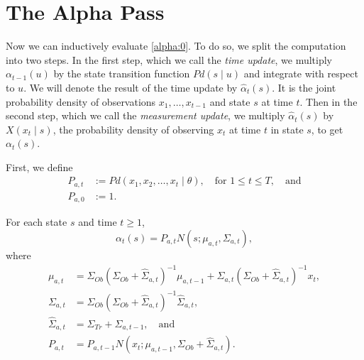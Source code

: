 \documentclass[12pt,leqno]{article}
\begin{document}
\section{The Alpha Pass}
  Now we can inductively evaluate \eqref{alpha:0}. To do so, we split the computation
  into two steps.  In the first step, which we call the {\em time update}, we multiply
  $\alpha_{t-1}(u)$ by the state transition function $Pd(s\mid u)$ and integrate with respect
  to $u$. We will denote the result of the time update by $\hat{\alpha}_t(s)$.  It is the joint probability
  density of observations $x_1,\dots,x_{t-1}$ and state $s$ at time $t$.
  Then in the second step, which we call the {\em measurement update}, we multiply
  $\hat{\alpha}_t(s)$ by $X(x_t \mid s)$, the probability density of observing $x_t$ at time $t$
  in state $s$, to get $\alpha_t(s)$.

  First, we define
\begin{align*}
  P_{a,t} &:= Pd(x_1,x_2,\dots,x_t \mid \theta),\quad\text{for $1\le t\le T$},\quad\text{and}\\
  P_{a,0} &:= 1.
\end{align*}

\begin{Thm}\label{alpha:1}
  For each state $s$ and time $t \ge 1$,
$$
  \alpha_t(s) = P_{a,t}N(s;\mu_{a,t},\Sigma_{a,t}),
$$
where
\begin{align*}
  \mu_{a,t} &= \Sigma_{Ob}(\Sigma_{Ob}+\widehat{\Sigma}_{a,t})^{-1}\mu_{a,t-1}
  + \widehat{\Sigma}_{a,t}(\Sigma_{Ob}+\widehat{\Sigma}_{a,t})^{-1}x_t, \\
  \Sigma_{a,t} &= \Sigma_{Ob}(\Sigma_{Ob}+\widehat{\Sigma}_{a,t})^{-1}\widehat{\Sigma}_{a,t},\\
  \widehat{\Sigma}_{a,t} &= \Sigma_{Tr}+\Sigma_{a,t-1},
 \quad\text{and}\\
  P_{a,t} &=P_{a,t-1}N(x_t;\mu_{a,t-1},\Sigma_{Ob} + \widehat{\Sigma}_{a,t}).
\end{align*}
\end{Thm}
\end{document}
